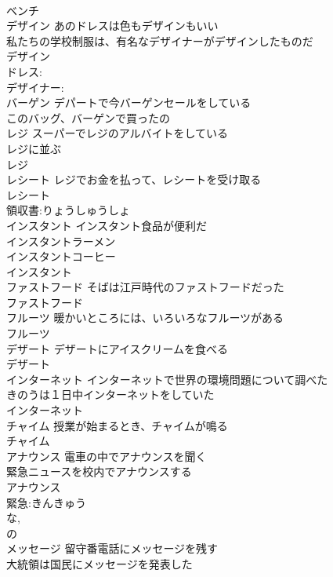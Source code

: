 \documentclass[8pt]{extreport}
\begin{document}
\begin{CJK}{UTF8}{min}
\\	ベンチ			
\\	デザイン	あのドレスは色もデザインもいい 
\\	私たちの学校制服は、有名なデザイナーがデザインしたものだ 
\\	デザイン			
\\	ドレス:
\\	デザイナー: 
\\	バーゲン	デパートで今バーゲンセールをしている 
\\	このバッグ、バーゲンで買ったの 
\\	レジ	スーパーでレジのアルバイトをしている 
\\	レジに並ぶ 
\\	レジ			
\\	レシート	レジでお金を払って、レシートを受け取る 
\\	レシート			
\\	領収書:りょうしゅうしょ
\\	インスタント	インスタント食品が便利だ 
\\	インスタントラーメン 
\\	インスタントコーヒー 
\\	インスタント			
\\	ファストフード	そばは江戸時代のファストフードだった 
\\	ファストフード			
\\	フルーツ	暖かいところには、いろいろなフルーツがある 
\\	フルーツ			
\\	デザート	デザートにアイスクリームを食べる 
\\	デザート			
\\	インターネット	インターネットで世界の環境問題について調べた 
\\	きのうは１日中インターネットをしていた 
\\	インターネット						
\\	チャイム	授業が始まるとき、チャイムが鳴る 
\\	チャイム			
\\	アナウンス	電車の中でアナウンスを聞く 
\\	緊急ニュースを校内でアナウンスする 
\\	アナウンス			
\\	緊急:きんきゅう
\\	な, 
\\	の 
\\	メッセージ	留守番電話にメッセージを残す 
\\	大統領は国民にメッセージを発表した 

\end{CJK}
\end{document}
